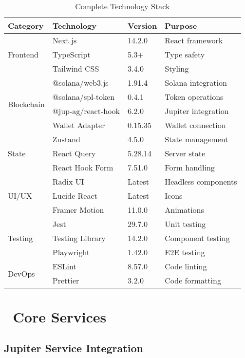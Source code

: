 \documentclass[11pt,a4paper]{article}
\begin{document}
\begin{table}[h]
\centering
\begin{tabular}{|l|l|l|l|}
\hline
\textbf{Category} & \textbf{Technology} & \textbf{Version} & \textbf{Purpose} \\
\hline
\multirow{3}{*}{Frontend} & Next.js & 14.2.0 & React framework \\
& TypeScript & 5.3+ & Type safety \\
& Tailwind CSS & 3.4.0 & Styling \\
\hline
\multirow{4}{*}{Blockchain} & @solana/web3.js & 1.91.4 & Solana integration \\
& @solana/spl-token & 0.4.1 & Token operations \\
& @jup-ag/react-hook & 6.2.0 & Jupiter integration \\
& Wallet Adapter & 0.15.35 & Wallet connection \\
\hline
\multirow{3}{*}{State} & Zustand & 4.5.0 & State management \\
& React Query & 5.28.14 & Server state \\
& React Hook Form & 7.51.0 & Form handling \\
\hline
\multirow{3}{*}{UI/UX} & Radix UI & Latest & Headless components \\
& Lucide React & Latest & Icons \\
& Framer Motion & 11.0.0 & Animations \\
\hline
\multirow{3}{*}{Testing} & Jest & 29.7.0 & Unit testing \\
& Testing Library & 14.2.0 & Component testing \\
& Playwright & 1.42.0 & E2E testing \\
\hline
\multirow{2}{*}{DevOps} & ESLint & 8.57.0 & Code linting \\
& Prettier & 3.2.0 & Code formatting \\
\hline
\end{tabular}
\caption{Complete Technology Stack}
\end{table}

\section{🔧 Core Services}

\subsection{Jupiter Service Integration}
\end{document}
